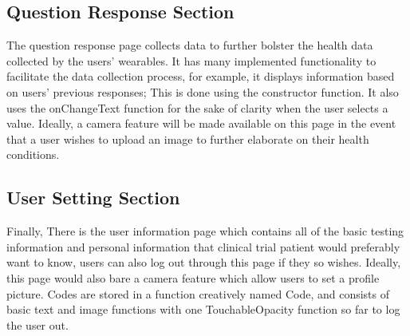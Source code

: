 \documentclass[]{book}
\begin{document}
\subsection{Question Response Section}\label{question-response-section}

The question response page collects data to further bolster the health
data collected by the users' wearables. It has many implemented
functionality to facilitate the data collection process, for example, it
displays information based on users' previous responses; This is done
using the constructor function. It also uses the onChangeText function
for the sake of clarity when the user selects a value. Ideally, a camera
feature will be made available on this page in the event that a user
wishes to upload an image to further elaborate on their health
conditions.

\subsection{User Setting Section}\label{user-setting-section}

Finally, There is the user information page which contains all of the
basic testing information and personal information that clinical trial
patient would preferably want to know, users can also log out through
this page if they so wishes. Ideally, this page would also bare a camera
feature which allow users to set a profile picture. Codes are stored in
a function creatively named Code, and consists of basic text and image
functions with one TouchableOpacity function so far to log the user out.
\end{document}
